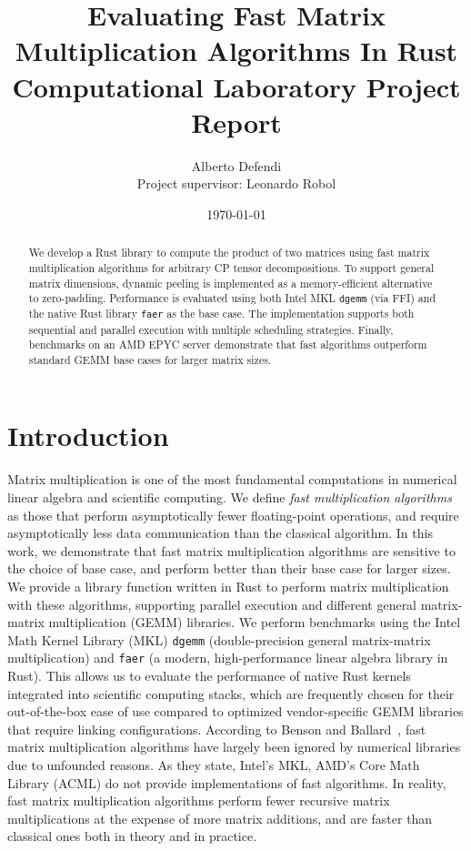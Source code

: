 \documentclass[a4paper, leqno, 11pt]{article}
\title{%
   Evaluating Fast Matrix Multiplication Algorithms In Rust
    \\ \large Computational Laboratory Project Report}
\author{Alberto Defendi\\Project supervisor: Leonardo Robol}
\date{\today}
\theoremstyle{definition}
\theoremstyle{remark}
\theoremstyle{experimental}
\begin{document}
\maketitle

\begin{abstract}
    \noindent We develop a Rust library to compute the product of two matrices using fast matrix
    multiplication algorithms for arbitrary CP tensor decompositions. To support general matrix
    dimensions, dynamic peeling is implemented as a memory-efficient alternative to zero-padding.
    Performance is evaluated using both Intel MKL \texttt{dgemm} (via FFI) and the native Rust
    library \texttt{faer} as the base case. The implementation supports both sequential and parallel
    execution with multiple scheduling strategies. Finally, benchmarks on an AMD EPYC server demonstrate
    that fast algorithms outperform standard GEMM base cases for larger matrix sizes.
\end{abstract}

{\setlength{\parskip}{0em}
\tableofcontents}

\section{Introduction}

Matrix multiplication is one of the most fundamental computations in numerical linear algebra and
scientific computing. We define \emph{fast multiplication algorithms} as those that perform
asymptotically fewer floating-point operations, and require asymptotically less data communication than the 
classical algorithm. In this work, we demonstrate that fast matrix multiplication algorithms
are sensitive to the choice of base case, and perform better than their base case for larger sizes.
We provide a library function written in Rust to perform matrix multiplication with these algorithms, supporting parallel execution and different general matrix-matrix multiplication (GEMM) libraries. We perform benchmarks using the Intel Math Kernel Library (MKL) \texttt{dgemm} (double-precision general matrix-matrix multiplication) and \texttt{faer} (a modern, high-performance linear algebra library in Rust). This allows us to evaluate the performance of native Rust kernels integrated into scientific computing stacks, which are frequently chosen for their out-of-the-box ease of use compared to optimized vendor-specific GEMM libraries that require linking configurations. 
According to Benson and Ballard~\cite{bensonballard2015}, fast matrix multiplication algorithms have
largely been ignored by numerical libraries due to unfounded reasons. As they state, Intel's MKL,
AMD's Core Math Library (ACML) do not provide implementations of fast algorithms. In reality, fast matrix
multiplication algorithms perform fewer recursive matrix multiplications at the expense
of more matrix additions, and are faster than classical ones both in theory and in practice.
\end{document}
